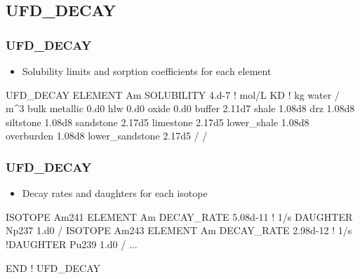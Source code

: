 \documentclass{beamer}
\newcommand\redcomment[1]{{{\color{red} #1}}}
\newcommand\bluecomment[1]{{{\color{blue} #1}}}
\begin{document}
\subsection{UFD\_DECAY}
\begin{frame}[fragile]\frametitle{UFD\_DECAY}

\begin{itemize}
  \item \redcomment{Solubility} limits and \redcomment{sorption} coefficients for each element
\end{itemize}

\begin{semiverbatim}\small
UFD_DECAY
  ELEMENT Am
    SOLUBILITY 4.d-7 \bluecomment{! mol/L}
    KD \bluecomment{! kg water / m^3 bulk}
      metallic 0.d0
      hlw 0.d0
      oxide 0.d0
      buffer 2.11d7
      shale 1.08d8
      drz 1.08d8
      siltstone 1.08d8
      sandstone 2.17d5
      limestone 2.17d5
      lower_shale 1.08d8
      overburden 1.08d8
      lower_sandstone 2.17d5
    /
  /
\end{semiverbatim}
\end{frame}

\begin{frame}[fragile]\frametitle{UFD\_DECAY}

\begin{itemize}
  \item \redcomment{Decay rates} and \redcomment{daughters} for each isotope
\end{itemize}

\begin{semiverbatim}\small
  ISOTOPE Am241
    ELEMENT Am
    DECAY_RATE 5.08d-11 \bluecomment{! 1/s}
    DAUGHTER Np237 1.d0
  /
  ISOTOPE Am243
    ELEMENT Am
    DECAY_RATE 2.98d-12 \bluecomment{! 1/s}
    \bluecomment{!DAUGHTER Pu239 1.d0}
  /
\bluecomment{...}

END \bluecomment{! UFD_DECAY}
\end{semiverbatim}
\end{frame}

\end{document}
